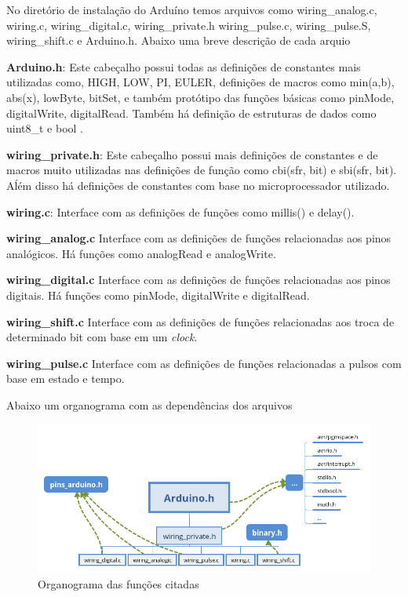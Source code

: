 No diretório de instalação do Arduíno temos arquivos como wiring\_analog.c, wiring.c, wiring\_digital.c, wiring\_private.h  wiring\_pulse.c, wiring\_pulse.S, wiring\_shift.c e Arduino.h. Abaixo uma breve descrição de cada arquio

\begin{alineas}
    \item \textbf{Arduino.h}: Este cabeçalho possui todas as definições de constantes mais utilizadas como, HIGH, LOW, PI, EULER, definições de macros como  min(a,b), abs(x), lowByte, bitSet, e também protótipo das funções básicas como pinMode, digitalWrite, digitalRead. Também há definição de estruturas de dados como uint8\_t e bool .
    \item \textbf{wiring\_private.h}: Este cabeçalho possui mais definições de constantes e de macros muito utilizadas nas definições de função como cbi(sfr, bit) e sbi(sfr, bit). Aĺém disso há definições de constantes com base no microprocessador utilizado.
    \item \textbf{wiring.c}: Interface com as definições de funções como millis() e delay(). 
    \item \textbf{wiring\_analog.c} Interface com as definições de funções relacionadas aos pinos analógicos. Há funções como analogRead e analogWrite. 
    \item \textbf{wiring\_digital.c} Interface com as definições de funções relacionadas aos pinos digitais. Há funções como pinMode, digitalWrite e digitalRead.
    \item \textbf{wiring\_shift.c} Interface com as definições de funções relacionadas aos troca de determinado bit com base em um \emph{clock}. 
    \item \textbf{wiring\_pulse.c} Interface com as definições de funções relacionadas a pulsos com base em estado e tempo. 
    
    Abaixo um organograma com as dependências dos arquivos
    
    \begin{figure}[htb]
    	\caption{\label{wiringIDE}Organograma das funções citadas}
    	\begin{center}
    	    \includegraphics[scale=0.5]{artigo/refs/org_head_arduino}
    	\end{center}
    \end{figure}
    
\end{alineas}

